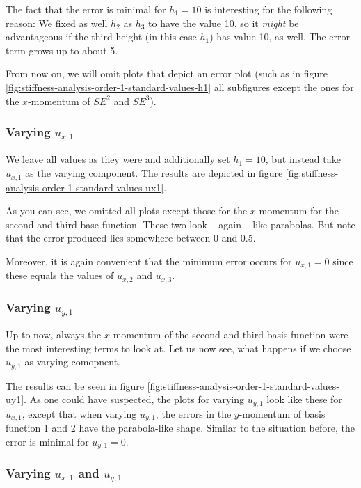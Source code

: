 \documentclass{article}
\begin{document}
The fact that the error is minimal for $h_1=10$ is interesting for the following reason: We fixed as well $h_2$ as $h_3$ to have the value 10, so it \emph{might} be advantageous if the third height (in this case $h_1$) has value 10, as well. The error term grows up to about 5.

From now on, we will omit plots that depict an error plot (such as in figure \ref{fig:stiffness-analysis-order-1-standard-values-h1} all subfigures except the ones for the $x$-momentum of $SE^2$ and $SE^3$).

\subsubsection{Varying $u_{x,1}$}

We leave all values as they were and additionally set $h_1=10$, but instead take $u_{x,1}$ as the varying component. The results are depicted in figure \ref{fig:stiffness-analysis-order-1-standard-values-ux1}.



As you can see, we omitted all plots except those for the $x$-momentum for the second and third base function. These two look -- again -- like parabolas. But note that the error produced lies somewhere between 0 and 0.5.

Moreover, it is again convenient that the minimum error occurs for $u_{x,1}=0$ since these equals the values of $u_{x,2}$ and $u_{x,3}$.

\subsubsection{Varying $u_{y,1}$}

Up to now, always the $x$-momentum of the second and third basis function were the most interesting terms to look at. Let us now see, what happens if we choose $u_{y,1}$ as varying comopnent.



The results can be seen in figure \ref{fig:stiffness-analysis-order-1-standard-values-uy1}. As one could have suspected, the plots for varying $u_{y,1}$ look like these for $u_{x,1}$, except that when varying $u_{y,1}$, the errors in the $y$-momentum of basis function 1 and 2 have the parabola-like shape. Similar to the situation before, the error is minimal for $u_{y,1}=0$.

\subsubsection{Varying $u_{x,1}$ and $u_{y,1}$}
\end{document}
